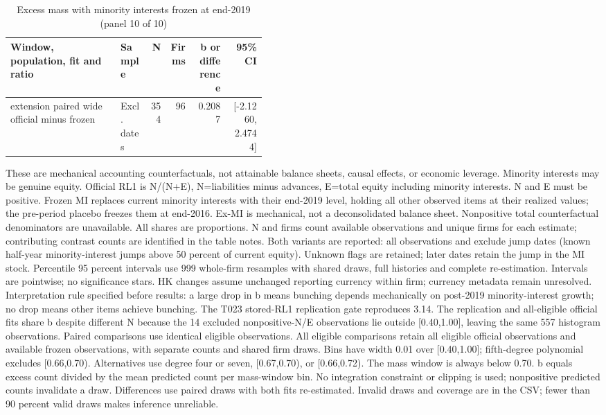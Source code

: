 \begin{table}[!htbp]\centering\scriptsize
\caption{Excess mass with minority interests frozen at end-2019 (panel 10 of 10)}
\begin{threeparttable}
\begin{tabular}{p{0.43\linewidth}lrrrr}
\toprule
Window, population, fit and ratio & Sample & N & Firms & b or difference & 95\% CI \\
\midrule
extension paired wide official minus frozen & Excl. dates & 354 & 96 & 0.2087 & [-2.1260, 2.4744] \\
\bottomrule
\end{tabular}
\begin{tablenotes}[flushleft]\footnotesize
\item[] These are mechanical accounting counterfactuals, not attainable balance sheets, causal effects, or economic leverage. Minority interests may be genuine equity. Official RL1 is N/(N+E), N=liabilities minus advances, E=total equity including minority interests. N and E must be positive. Frozen MI replaces current minority interests with their end-2019 level, holding all other observed items at their realized values; the pre-period placebo freezes them at end-2016. Ex-MI is mechanical, not a deconsolidated balance sheet. Nonpositive total counterfactual denominators are unavailable. All shares are proportions. N and firms count available observations and unique firms for each estimate; contributing contrast counts are identified in the table notes. Both variants are reported: all observations and exclude jump dates (known half-year minority-interest jumps above 50 percent of current equity). Unknown flags are retained; later dates retain the jump in the MI stock. Percentile 95 percent intervals use 999 whole-firm resamples with shared draws, full histories and complete re-estimation. Intervals are pointwise; no significance stars. HK changes assume unchanged reporting currency within firm; currency metadata remain unresolved. Interpretation rule specified before results: a large drop in b means bunching depends mechanically on post-2019 minority-interest growth; no drop means other items achieve bunching. The T023 stored-RL1 replication gate reproduces 3.14. The replication and all-eligible official fits share b despite different N because the 14 excluded nonpositive-N/E observations lie outside [0.40,1.00], leaving the same 557 histogram observations. Paired comparisons use identical eligible observations. All eligible comparisons retain all eligible official observations and available frozen observations, with separate counts and shared firm draws. Bins have width 0.01 over [0.40,1.00]; fifth-degree polynomial excludes [0.66,0.70). Alternatives use degree four or seven, [0.67,0.70), or [0.66,0.72). The mass window is always below 0.70. b equals excess count divided by the mean predicted count per mass-window bin. No integration constraint or clipping is used; nonpositive predicted counts invalidate a draw. Differences use paired draws with both fits re-estimated. Invalid draws and coverage are in the CSV; fewer than 90 percent valid draws makes inference unreliable.

\end{tablenotes}
\end{threeparttable}
\end{table}
